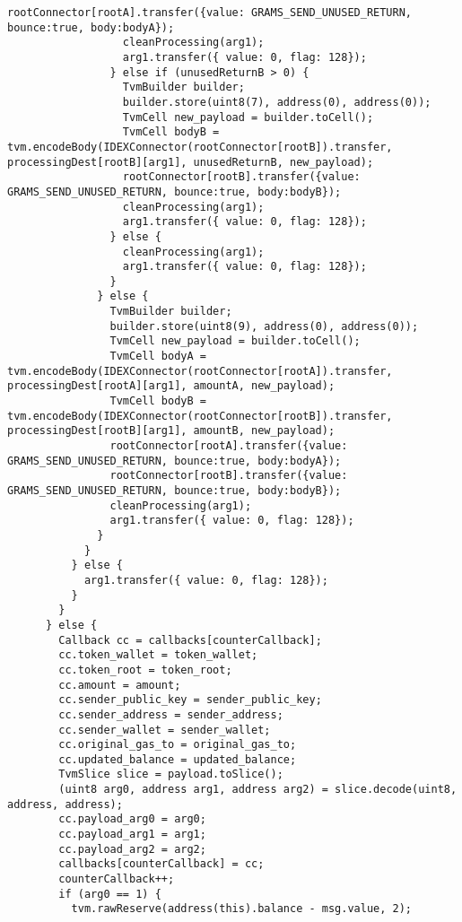 \begin{lstlisting}[firstnumber=248]
                  rootConnector[rootA].transfer({value: GRAMS_SEND_UNUSED_RETURN, bounce:true, body:bodyA});
                  cleanProcessing(arg1);
                  arg1.transfer({ value: 0, flag: 128});
                } else if (unusedReturnB > 0) {
                  TvmBuilder builder;
                  builder.store(uint8(7), address(0), address(0));
                  TvmCell new_payload = builder.toCell();
                  TvmCell bodyB = tvm.encodeBody(IDEXConnector(rootConnector[rootB]).transfer, processingDest[rootB][arg1], unusedReturnB, new_payload);
                  rootConnector[rootB].transfer({value: GRAMS_SEND_UNUSED_RETURN, bounce:true, body:bodyB});
                  cleanProcessing(arg1);
                  arg1.transfer({ value: 0, flag: 128});
                } else {
                  cleanProcessing(arg1);
                  arg1.transfer({ value: 0, flag: 128});
                }
              } else {
                TvmBuilder builder;
                builder.store(uint8(9), address(0), address(0));
                TvmCell new_payload = builder.toCell();
                TvmCell bodyA = tvm.encodeBody(IDEXConnector(rootConnector[rootA]).transfer, processingDest[rootA][arg1], amountA, new_payload);
                TvmCell bodyB = tvm.encodeBody(IDEXConnector(rootConnector[rootB]).transfer, processingDest[rootB][arg1], amountB, new_payload);
                rootConnector[rootA].transfer({value: GRAMS_SEND_UNUSED_RETURN, bounce:true, body:bodyA});
                rootConnector[rootB].transfer({value: GRAMS_SEND_UNUSED_RETURN, bounce:true, body:bodyB});
                cleanProcessing(arg1);
                arg1.transfer({ value: 0, flag: 128});
              }
            }
          } else {
            arg1.transfer({ value: 0, flag: 128});
          }
        }
      } else {
        Callback cc = callbacks[counterCallback];
        cc.token_wallet = token_wallet;
        cc.token_root = token_root;
        cc.amount = amount;
        cc.sender_public_key = sender_public_key;
        cc.sender_address = sender_address;
        cc.sender_wallet = sender_wallet;
        cc.original_gas_to = original_gas_to;
        cc.updated_balance = updated_balance;
        TvmSlice slice = payload.toSlice();
        (uint8 arg0, address arg1, address arg2) = slice.decode(uint8, address, address);
        cc.payload_arg0 = arg0;
        cc.payload_arg1 = arg1;
        cc.payload_arg2 = arg2;
        callbacks[counterCallback] = cc;
        counterCallback++;
        if (arg0 == 1) {
          tvm.rawReserve(address(this).balance - msg.value, 2);

\end{lstlisting}
